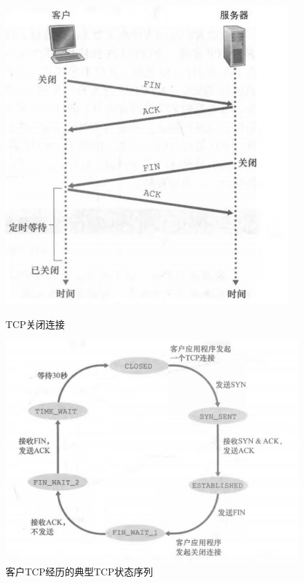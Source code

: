 \begin{figure}[htbp]
    \begin{minipage}[t]{0.5\textwidth}
        \centering
        \includegraphics[width=\textwidth]{image/chapter03/TCP关闭连接.png}
        \caption{TCP关闭连接}
    \end{minipage}
    
    \begin{minipage}[t]{0.5\textwidth}
        \centering
        \includegraphics[width=\textwidth]{image/chapter03/TCP关闭状态.png}
        \caption{客户TCP经历的典型TCP状态序列}
    \end{minipage}    
\end{figure}

